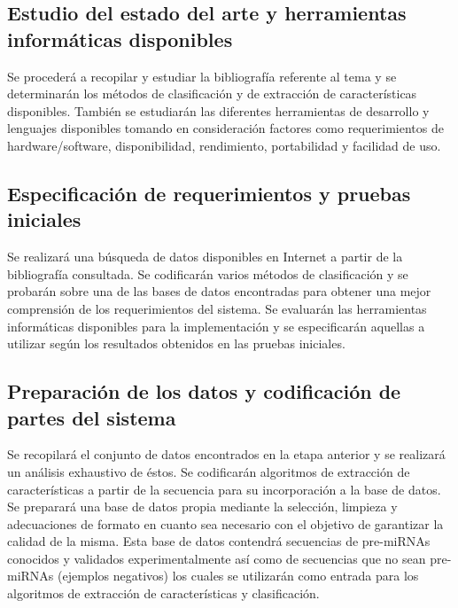 \documentclass[12pt,bibliography=openstyle,DIV=12,parskip=full-]{scrartcl}
\begin{document}
\subsection{Estudio del estado del arte y herramientas informáticas
  disponibles}
Se procederá a recopilar y estudiar la bibliografía referente al tema
y se determinarán los métodos de clasificación y de extracción de
características disponibles. También se estudiarán las diferentes
herramientas de desarrollo y lenguajes disponibles tomando en
consideración factores como requerimientos de hardware/software,
disponibilidad, rendimiento, portabilidad y facilidad de uso.
%

\subsection{Especificación de requerimientos y pruebas iniciales}
Se realizará una búsqueda de datos disponibles en Internet a partir de
la bibliografía consultada.  Se codificarán varios métodos de
clasificación y se probarán sobre una de las bases de datos
encontradas para obtener una mejor comprensión de los requerimientos
del sistema.
%
Se evaluarán las herramientas informáticas disponibles para la
implementación y se especificarán aquellas a utilizar según los
resultados obtenidos en las pruebas iniciales.
%
\subsection{Preparación de los datos y codificación de partes del sistema}
Se recopilará el conjunto de datos encontrados en la etapa anterior
y se realizará un análisis exhaustivo de éstos.
Se codificarán algoritmos de extracción de características a partir de
la secuencia para su incorporación a la base de datos.
Se preparará una base
de datos propia mediante la selección, limpieza y adecuaciones de
formato en cuanto sea necesario con el objetivo de garantizar la
calidad de la misma. Esta base de datos contendrá secuencias de
pre-miRNAs conocidos y validados experimentalmente así como de
secuencias que no sean pre-miRNAs (ejemplos negativos) los cuales se
utilizarán como entrada para los algoritmos de extracción de
características y clasificación.
\end{document}
